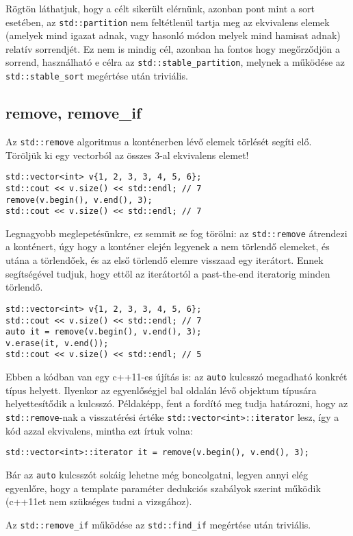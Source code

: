 \documentclass[../cpp_book/cpp_book.tex]{subfiles}
\begin{document}
	Rögtön láthatjuk, hogy a célt sikerült elérnünk, azonban pont mint a sort esetében, az \texttt{std::partition} nem feltétlenül tartja meg az ekvivalens elemek (amelyek mind igazat adnak, vagy hasonló módon melyek mind hamisat adnak) relatív sorrendjét. Ez nem is mindig cél, azonban ha fontos hogy megőrződjön a sorrend, használható e célra az \texttt{std::stable\_partition}, melynek a működése az \texttt{std::stable\_sort} megértése után triviális.
	\subsection{remove, remove\_if}
	Az \texttt{std::remove} algoritmus a konténerben lévő elemek törlését segíti elő. Töröljük ki egy vectorból az összes 3-al ekvivalens elemet!
	\begin{lstlisting}
std::vector<int> v{1, 2, 3, 3, 4, 5, 6};
std::cout << v.size() << std::endl; // 7
remove(v.begin(), v.end(), 3);
std::cout << v.size() << std::endl; // 7
	\end{lstlisting}
	Legnagyobb meglepetésünkre, ez semmit se fog törölni: az \texttt{std::remove} átrendezi a konténert, úgy hogy a konténer elején legyenek a nem törlendő elemeket, és utána a törlendőek, és az első törlendő elemre visszaad egy iterátort. Ennek segítségével tudjuk, hogy ettől az iterátortól a past-the-end iteratorig minden törlendő.
	\begin{lstlisting}
std::vector<int> v{1, 2, 3, 3, 4, 5, 6};
std::cout << v.size() << std::endl; // 7
auto it = remove(v.begin(), v.end(), 3);
v.erase(it, v.end());
std::cout << v.size() << std::endl; // 5
	\end{lstlisting}
	\begin{note}
		Ebben a kódban van egy c++11-es újítás is: az \texttt{auto} kulcsszó megadható konkrét típus helyett. Ilyenkor az egyenlőségjel bal oldalán lévő objektum típusára helyettesítődik a kulcsszó. Példaképp, fent a fordító meg tudja határozni, hogy az \texttt{std::remove}-nak a visszatérési értéke \texttt{std::vector<int>::iterator} lesz, így a kód azzal ekvivalens, mintha ezt írtuk volna:
		
		{\centering\texttt{std::vector<int>::iterator it = remove(v.begin(), v.end(), 3);} \par}
		
		Bár az \texttt{auto} kulcsszót sokáig lehetne még boncolgatni, legyen annyi elég egyenlőre, hogy a template paraméter dedukciós szabályok szerint működik (c++11et nem szükséges tudni a vizsgához).
	\end{note}
	Az \texttt{std::remove\_if} működése az \texttt{std::find\_if} megértése után triviális.
	
\end{document}
